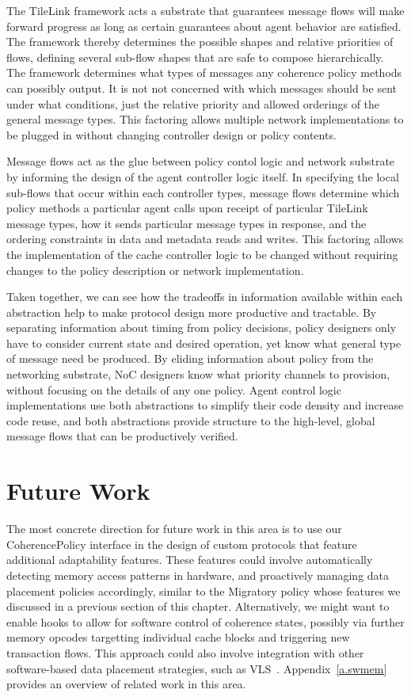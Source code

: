 The TileLink framework acts a substrate that guarantees message flows will make forward progress
as long as certain guarantees about agent behavior are satisfied.
The framework thereby determines the possible shapes and relative priorities of flows,
defining several sub-flow shapes that are safe to compose hierarchically.
The framework determines what types of messages any coherence policy methods can possibly output.
It is not not concerned with which messages should be sent under what conditions,
just the relative priority and allowed orderings of the general message types.
This factoring allows multiple network implementations to be plugged in without changing controller design
or policy contents.

Message flows act as the glue between policy contol logic and network substrate by informing the design of the agent controller logic itself.
In specifying the local sub-flows that occur within each controller types, message flows determine
which policy methods a particular agent calls upon receipt of particular TileLink message types,
how it sends particular message types in response,
and the ordering constraints in data and metadata reads and writes.
This factoring allows the implementation of the cache controller logic
to be changed without requiring changes to the policy description or network implementation.

Taken together, we can see how the tradeoffs in information available within each abstraction
help to make protocol design more productive and tractable.
By separating information about timing from policy decisions, policy designers only have to consider
current state and desired operation, yet know what general type of message need be produced.
By eliding information about policy from the networking substrate, NoC designers know what priority channels to provision, without focusing on the details of any one policy.
Agent control logic implementations use both abstractions to simplify their code density and increase code reuse, and
both abstractions provide structure to the high-level, global message flows that can be productively verified.

\section{Future Work}

The most concrete direction for future work in this area is to use our CoherencePolicy interface
in the design of custom protocols that feature additional adaptability features.
These features could involve automatically detecting memory access patterns in hardware,
and proactively managing data placement policies accordingly, similar to 
the Migratory policy whose features we discussed in a previous section of this chapter.
Alternatively, we might want to enable hooks to allow for software control of coherence states,
possibly via further memory opcodes targetting individual cache blocks and triggering new transaction flows.
This approach could also involve integration with other software-based data placement strategies, such as VLS~\cite{Cook:EECS-2009-131}.
Appendix~\ref{a.swmem} provides an overview of related work in this area.

